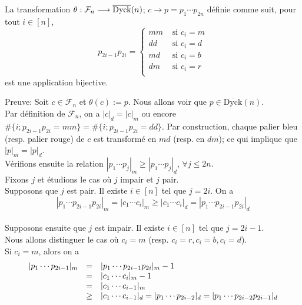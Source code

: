\begin{proposition} \label{bij-DyckBar}
	La transformation $\theta: \mathcal{F}_{n} \longrightarrow  \overline{\rm{Dyck}}(n)$; $c \longrightarrow p=p_{1}\cdots p_{2n}$ définie comme suit, pour tout $i \in [n]$,
	$$
		p_{2i-1}p_{2i}=\begin{cases}
			mm & \text{ si } c_{i}=m \\
			dd & \text{ si } c_{i}=d \\
			md & \text{ si } c_{i}=b \\
			dm & \text{ si } c_{i}=r \\
		\end{cases}
	$$
	est une application bijective.
\end{proposition}
Preuve: Soit $c\in \mathcal{F}_{n}$ et $\theta(c):=p$.
Nous allons voir que $p\in \overline{\text{Dyck}}(n) $.\\
Par définition de $\mathcal{F}_{n}$, on a $|c|_{d}=|c|_{m}$ ou encore \\$\#\{i; p_{2i-1}p_{2i}=mm\}=\#\{i; p_{2i-1}p_{2i}=dd\}$. Par construction, chaque palier
bleu (resp. palier rouge) de $c$ est transformé en $md$ (resp. en $dm$); ce qui implique que $|p|_{m}=|p|_{d}$.\\
Vérifions ensuite la relation $|p_{1} \cdots p_{j}|_{m}\geq |p_{1} \cdots p_{j}|_{d}$, $\forall j\leq 2n$.\\
Fixons $j$ et étudions le cas où $j$ impair et $j$ pair. \\
Supposons que $j$ est pair. Il existe $i\in [n]$ tel que $j=2i$. On a \vspace{5pt}\\
\[
	|p_{1} \cdots p_{2i-1}p_{2i}|_{m} = |c_{1} \cdots c_{i}|_{m}\geq |c_{1} \cdots c_{i}|_{d} = |p_{1} \cdots p_{2i-1}p_{2i}|_{d}
\]
\text{}\vspace{5pt}\\
Supposons ensuite que $j$ est impair. Il existe $i\in [n]$ tel que $j = 2i-1$.\\ Nous allons distinguer le cas où $c_{i} = m$ (resp. $c_{i}=r, c_{i}=b, c_{i}=d$).\\
Si $c_{i}=m$, alors on a \vspace{5pt}\\
\[
	\begin{array} {l l l}
		| p_{1}\cdots p_{2i-1} |_{m} & =    & | p_{1}\cdots p_{2i-1}p_{2i} |_{m} -1                                                           \\
		                             & =    & | c_{1}\cdots c_{i} |_{m} -1                                                                    \\
		                             & =    & | c_{1}\cdots c_{i-1} |_{m}                                                                     \\
		                             & \geq & | c_{1}\cdots c_{i-1} |_{d} =| p_{1}\cdots p_{2i-2} |_{d} =| p_{1}\cdots p_{2i-2}p_{2i-1} |_{d} \\
	\end{array}
\]
